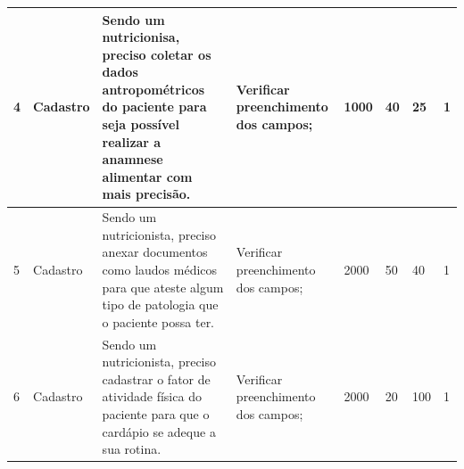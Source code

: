\documentclass[
	12pt,				%
    oneside,			%
	a4paper,			%
	english,			%
	french,				%
	spanish,			%
	brazil,				%
	]{abntex2}
\begin{document}
\begin{apendicesenv}
\begin{landscape}
\begin{table}[h]
\begin{tabular}{|p{0.5cm}|p{2cm}|p{5cm}|p{4cm}|p{2.5cm}|p{3.7cm}|p{2cm}|p{2cm}|}
4                               & Cadastro                          & Sendo um nutricionisa, preciso coletar os dados antropométricos do paciente para seja possível realizar a anamnese alimentar com mais precisão. & Verificar preenchimento dos campos;                 & 1000                                               & 40                                                          & 25                                       & 1                                   \\ \hline
5                               & Cadastro                          & Sendo um nutricionista, preciso anexar documentos como laudos médicos para que ateste algum tipo de patologia que o paciente possa ter.         & Verificar preenchimento dos campos;                 & 2000                                               & 50                                                          & 40                                       & 1                                   \\ \hline
6                               & Cadastro                          & Sendo um nutricionista, preciso cadastrar o fator de atividade física do paciente para que o cardápio se adeque a sua rotina.                   & Verificar preenchimento dos campos;                 & 2000                                               & 20                                                          & 100                                      & 1                               	\\ \hline
\end{tabular}
\end{table}

\end{landscape}
\end{apendicesenv}
\end{document}
